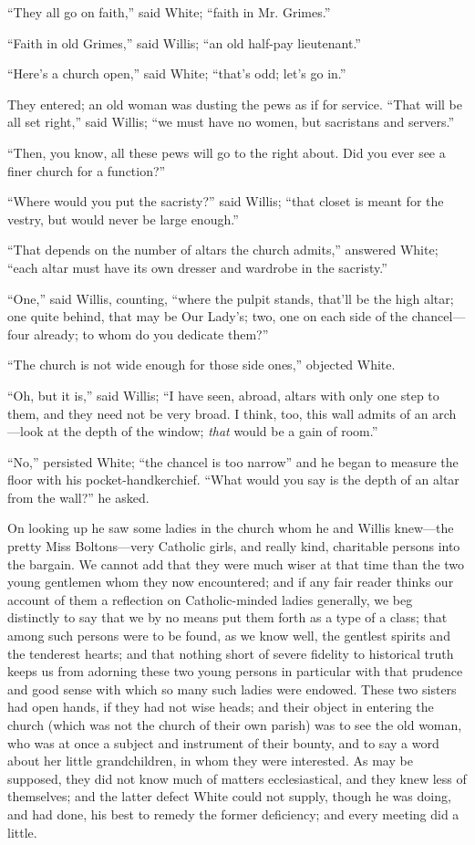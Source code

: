 ``They all go on faith,'' said White; ``faith in Mr.
Grimes.''

``Faith in old Grimes,'' said Willis; ``an old half-pay
lieutenant.''

``Here's a church open,'' said White; ``that's odd; let's
go in.''

They entered; an old woman was dusting the pews as if for service.
``That will be all set right,'' said Willis; ``we must
have no women, but sacristans and servers.''

``Then, you know, all these pews will go to the right about.
Did you ever see a finer church for a function?''

``Where would you put the sacristy?'' said Willis;
``that closet is meant for the vestry, but would never be large
enough.''

``That depends on the number of altars the church admits,''
answered White; ``each altar must have its own dresser and
wardrobe in the sacristy.''

``One,'' said Willis, counting, ``where the pulpit
stands, that'll be the high altar; one quite behind, that may be
Our Lady's; two, one on each side of the chancel—four already; to
whom do you dedicate them?''

``The church is not wide enough for those side ones,''
objected White.

``Oh, but it is,'' said Willis; ``I have seen, abroad,
altars with only one step to them, and they need not be very broad. I
think, too, this wall admits of an arch—look at the depth of the
window; \emph{that} would be a gain of room.''

``No,'' persisted White; ``the chancel is too
narrow'' and he began to measure the floor with his
pocket-handkerchief. ``What would you say is the depth of an altar
from the wall?'' he asked.

On looking up he saw some ladies in the church whom he and Willis
knew—the pretty Miss Boltons—very Catholic girls, and really kind,
charitable persons into the bargain. We cannot add that they were much
wiser at that time than the two young gentlemen whom they now
encountered; and if any fair reader thinks our account of them a
reflection on Catholic-minded ladies generally, we beg distinctly to
say that we by no means put them forth as a type of a class; that
among such persons were to be found, as we know well, the gentlest
spirits and the tenderest hearts; and that nothing short of severe
fidelity to historical truth keeps us from adorning these two young
persons in particular with that prudence and good sense with which so
many such ladies were endowed. These two sisters had open hands, if
they had not wise heads; and their object in entering the church
(which was not the church of their own parish) was to see the old
woman, who was at once a subject and instrument of their bounty, and
to say a word about her little grandchildren, in whom they were
interested. As may be supposed, they did not know much of matters
ecclesiastical, and they knew less of themselves; and the latter
defect White could not supply, though he was doing, and had done, his
best to remedy the former deficiency; and every meeting did a little.

